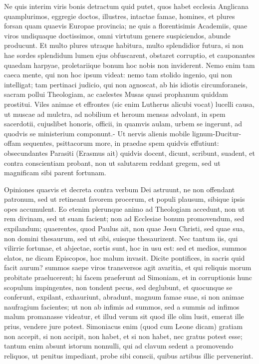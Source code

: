 {{{Ne quis interim viris bonis detractum quid putet, quos habet ecclesia Anglicana quamplurimos,
eggregie doctos, illustres, intactae famae, homines, et plures forsan
quam quaevis Europae provincia; ne quis a florentisimis Academiis, quae
viros undiquaque doctissimos, omni virtutum genere suspiciendos, abunde
producunt. Et multo plures utraque habitura, multo splendidior futura,
si non hae sordes splendidum lumen ejus obfuscarent, obstaret
corruptio, et cauponantes quaedam harpyae, proletariique bonum hoc
nobis non inviderent. Nemo enim tam caeca mente, qui non hoc ipsum
videat: nemo tam stolido ingenio, qui non intelligat; tam pertinaci
judicio, qui non agnoscat, ab his idiotis circumforaneis, sacram pollui
Theologiam, ac caelestes Musas quasi prophanum quiddam prostitui. Viles
animae et effrontes (sic enim Lutherus  alicubi vocat) lucelli
causa, ut muscae ad mulctra, ad nobilium et heroum mensas advolant, in
spem sacerdotii, cujuslibet honoris, officii, in quamvis aulam, urbem
se ingerunt, ad quodvis se ministerium componunt.- Ut nervis alienis
mobile lignum-Ducitur-  offam sequentes,
psittacorum more, in praedae spem quidvis effutiunt: obsecundantes
Parasiti (Erasmus ait) quidvis docent, dicunt, scribunt, suadent,
et contra conscientiam probant, non ut salutarem reddant gregem, sed ut
magnificam sibi parent fortunam.

Opiniones quasvis et decreta contra verbum Dei astruunt, ne non offendant patronum, sed ut retineant
favorem procerum, et populi plausum, sibique ipsis opes accumulent. Eo
etenim plerunque animo ad Theologiam accedunt, non ut rem divinam, sed
ut suam facient; non ad Ecclesiae bonum promovendum, sed expilandum;
quaerentes, quod Paulus ait, non quae Jesu Christi, sed quae sua, non
domini thesaurum, sed ut sibi, suisque thesaurizent. Nec tantum iis,
qui vilirrie fortunae, et abjectae, sortis sunt, hoc in usu est: sed et
medios, summos elatos, ne dicam Episcopos, hoc malum invasit. 
Dicite pontifices, in sacris quid facit aurum? summos saepe viros
transversos agit avaritia, et qui reliquis morum probitate
praelucerent; hi facem praeferunt ad Simoniam, et in corruptionis hunc
scopulum impingentes, non tondent pecus, sed deglubunt, et quocunque se
conferunt, expilant, exhauriunt, abradunt, magnum famae suae, si non
animae naufragium facientes; ut non ab infimis ad summos, sed a summis
ad infimos malum promanasse videatur, et illud verum sit quod ille olim
lusit, emerat ille prius, vendere jure potest. Simoniacus enim (quod
cum Leone dicam) gratiam non accepit, si non accipit, non habet, et si
non habet, nec gratus potest esse; tantum enim absunt istorum nonnulli,
qui ad clavum sedent a promovendo reliquos, ut penitus impediant, probe
sibi conscii, quibus artibus illic pervenerint.

}}}

